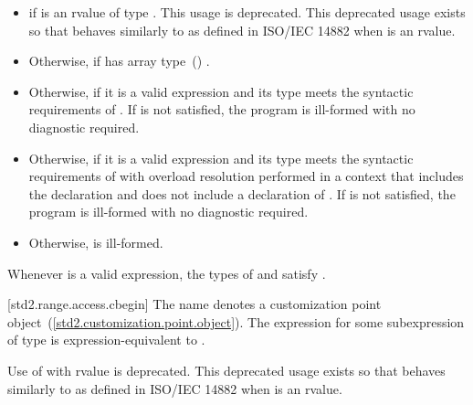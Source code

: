 \begin{itemize}
\item
   if  is an rvalue of
  type . This usage is deprecated.
  \enternote This deprecated usage exists so that
   behaves similarly to 
  as defined in ISO/IEC 14882 when  is an rvalue. \exitnote

\item
  Otherwise,  if  has array
  type~() .

\item
  Otherwise,  if it is a valid expression and its type  meets the
  syntactic requirements of
  . If
   is not satisfied, the program is ill-formed with
  no diagnostic required.

\item
  Otherwise,  if it is a valid expression and its type  meets the
  syntactic requirements of
   with overload
  resolution performed in a context that includes the declaration
   and does not include
  a declaration of . If  is not
  satisfied, the program is ill-formed with no diagnostic required.

\item
  Otherwise,  is ill-formed.
\end{itemize}

\pnum
\enternote Whenever  is a valid expression, the
types of  and  satisfy
. \exitnote

[std2.range.access.cbegin]{}
\pnum
The name  denotes a customization point
object~(\ref{std2.customization.point.object}). The expression
 for some subexpression  of type 
is expression-equivalent to .

\pnum
Use of  with rvalue  is deprecated.
\enternote This deprecated usage exists so that 
behaves similarly to  as defined in ISO/IEC 14882 when
 is an rvalue. \exitnote

